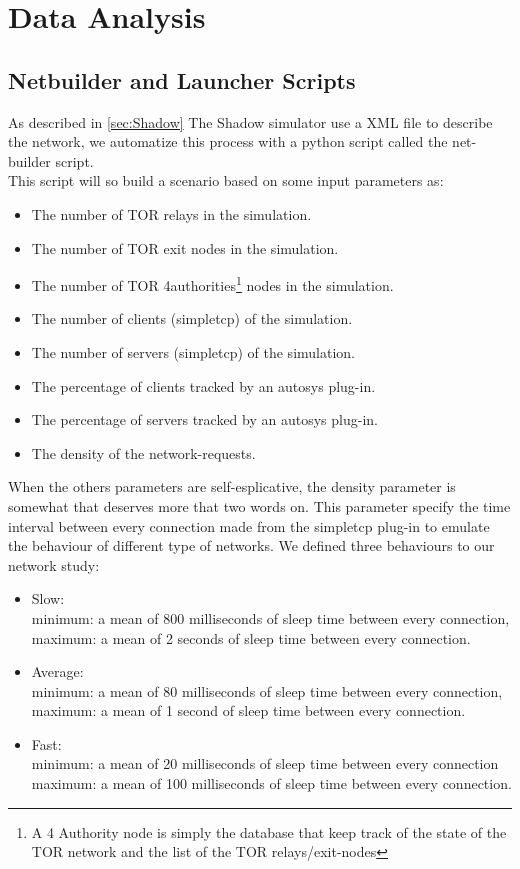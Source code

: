 \section{Data Analysis}
\subsection{Netbuilder and Launcher Scripts}
As described in \ref{sec:Shadow}
The Shadow simulator use a XML file to describe the network,
we automatize this process with a python script called the net-builder script.\\
This script will so build a scenario based on some input parameters as:
\begin{itemize}
\item The number of TOR relays in the simulation.
\item The number of TOR exit nodes in the simulation.
\item The number of TOR 4authorities\footnote{A 4 Authority node is simply the
database that keep track of the state of the TOR network and the list
of the TOR relays/exit-nodes} nodes in the simulation.
\item The number of clients (simpletcp) of the simulation.
\item The number of servers (simpletcp) of the simulation.
\item The percentage of clients tracked by an autosys plug-in.
\item The percentage of servers tracked by an autosys plug-in.
\item The density of the network-requests.
\end{itemize}

When the others parameters are self-esplicative, the density parameter is somewhat
that deserves more that two words on.
This parameter specify the time interval between every connection made from the
simpletcp plug-in to emulate the behaviour of different type of networks.
We defined three behaviours to our network study:

\begin{itemize}
\item Slow:\\minimum: a mean of 800 milliseconds of sleep time between every connection,\\
            maximum: a mean of 2 seconds of sleep time between every connection.
\item Average:\\minimum: a mean of 80 milliseconds of sleep time between every connection,\\
               maximum: a mean of 1 second of sleep time between every connection.
\item Fast:\\minimum: a mean of 20 milliseconds of sleep time between every connection\\
            maximum: a mean of 100 milliseconds of sleep time between every connection.
\end{itemize}

